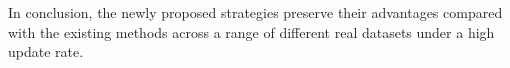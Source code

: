 In conclusion, the newly proposed strategies preserve their advantages compared with the existing methods across a range of different real datasets under a high update rate.

